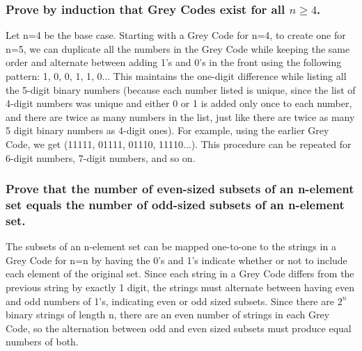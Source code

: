 
\subsubsection{Prove by induction that Grey Codes exist for all $n \geq{4}$.}
Let n=4 be the base case. Starting with a Grey Code for n=4, to create one for n=5, we can duplicate all the numbers in the Grey Code while keeping the same order and alternate between adding 1's and 0's in the front using the following pattern: 1, 0, 0, 1, 1, 0... This maintains the one-digit difference while listing all the 5-digit binary numbers (because each number listed is unique, since the list of 4-digit numbers was unique and either 0 or 1 is added only once to each number, and there are twice as many numbers in the list, just like there are twice as many 5 digit binary numbers as 4-digit ones). For example, using the earlier Grey Code, we get (11111, 01111, 01110, 11110...). This procedure can be repeated for 6-digit numbers, 7-digit numbers, and so on.


\subsubsection{Prove that the number of even-sized subsets of an n-element set equals the number of odd-sized subsets of an n-element set.}
The subsets of an n-element set can be mapped one-to-one to the strings in a Grey Code for n=n by having the 0's and 1's indicate whether or not to include each element of the original set. Since each string in a Grey Code differs from the previous string by exactly 1 digit, the strings must alternate between having even and odd numbers of 1's, indicating even or odd sized subsets. Since there are $2^n$ binary strings of length n, there are an even number of strings in each Grey Code, so the alternation between odd and even sized subsets must produce equal numbers of both. 


